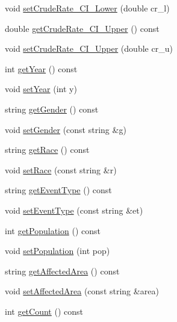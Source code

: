 \begin{DoxyCompactItemize}
\item 
void \hyperlink{classbridges_1_1_cancer_incidence_a58cdb11fa6e8d2766d3ef98b1e8aea1f}{set\+Crude\+Rate\+\_\+\+C\+I\+\_\+\+Lower} (double cr\+\_\+l)
\item 
double \hyperlink{classbridges_1_1_cancer_incidence_a0279f67ef72c3b175b2826c95ad40fe7}{get\+Crude\+Rate\+\_\+\+C\+I\+\_\+\+Upper} () const 
\item 
void \hyperlink{classbridges_1_1_cancer_incidence_a40d654a767d9b20ffa6931591d96d42a}{set\+Crude\+Rate\+\_\+\+C\+I\+\_\+\+Upper} (double cr\+\_\+u)
\item 
int \hyperlink{classbridges_1_1_cancer_incidence_ac2bd1a22a450657f2bd66b4d396bbba7}{get\+Year} () const 
\item 
void \hyperlink{classbridges_1_1_cancer_incidence_ac4c0d949ebb21dd890afe2714962fa5a}{set\+Year} (int y)
\item 
string \hyperlink{classbridges_1_1_cancer_incidence_af6105f18be298edff9b29b73bc3e1c81}{get\+Gender} () const 
\item 
void \hyperlink{classbridges_1_1_cancer_incidence_ad4b8d6d3b226567f60af07fa8e5d21ae}{set\+Gender} (const string \&g)
\item 
string \hyperlink{classbridges_1_1_cancer_incidence_a6e3850afa2162bee89ab5b8fa8462ddc}{get\+Race} () const 
\item 
void \hyperlink{classbridges_1_1_cancer_incidence_ae7cfd7532ab68ad521cc41d5172fd006}{set\+Race} (const string \&r)
\item 
string \hyperlink{classbridges_1_1_cancer_incidence_a14696225e64e30c88415f9436ec9c0ac}{get\+Event\+Type} () const 
\item 
void \hyperlink{classbridges_1_1_cancer_incidence_af17d0ebdf1a67834947e9cf5828c8fe3}{set\+Event\+Type} (const string \&et)
\item 
int \hyperlink{classbridges_1_1_cancer_incidence_a1667cd51355846ea7a746d120a7749f1}{get\+Population} () const 
\item 
void \hyperlink{classbridges_1_1_cancer_incidence_aaade0295abaeeabb23b9e03d5ffd364a}{set\+Population} (int pop)
\item 
string \hyperlink{classbridges_1_1_cancer_incidence_a0e64c2b77342aa72bcd0a460a9b994e0}{get\+Affected\+Area} () const 
\item 
void \hyperlink{classbridges_1_1_cancer_incidence_a4fc0d4133af2fef77b6b43c0d54f0e14}{set\+Affected\+Area} (const string \&area)
\item 
int \hyperlink{classbridges_1_1_cancer_incidence_a9d75ff868d631db828ad2eb22f6f90b4}{get\+Count} () const 

\end{DoxyCompactItemize}
